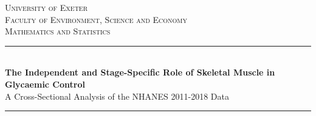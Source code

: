 \newcommand{\HRule}{\rule{\linewidth}{0.5mm}} %
	
	\center %
	
	
	\textsc{\LARGE University of Exeter}\\[1.5cm] %
	
	\textsc{\Large Faculty of Environment, Science and Economy}\\[0.5cm] %
	
	\textsc{\large Mathematics and Statistics}\\[0.5cm] %
	
	
	\HRule\\[0.4cm]
	
	{\LARGE\bfseries The Independent and Stage-Specific Role of Skeletal Muscle in Glycaemic Control}\\[0.4cm] %

        {\large A Cross-Sectional Analysis of the NHANES 2011-2018 Data}\\[0.4cm] %
	
	\HRule\\[1.5cm]
	
	
	
